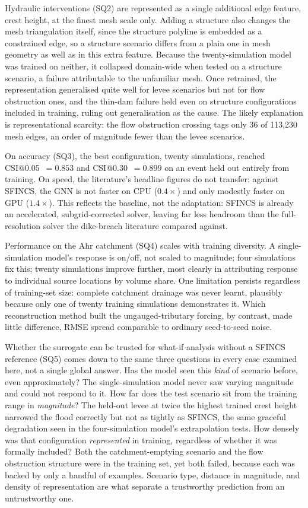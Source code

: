\documentclass[12pt,a4paper]{report}
\begin{document}
{Hydraulic interventions (SQ2) are represented as a single additional edge feature, crest height, at the finest mesh scale only. Adding a structure also changes the mesh triangulation itself, since the structure polyline is embedded as a constrained edge, so a structure scenario differs from a plain one in mesh geometry as well as in this extra feature. Because the twenty-simulation model was trained on neither, it collapsed domain-wide when tested on a structure scenario, a failure attributable to the unfamiliar mesh. Once retrained, the representation
generalised quite well for levee scenarios but not for flow obstruction ones, and the thin-dam
failure held even on structure configurations included in training, ruling out generalisation as the cause. The likely
explanation is representational scarcity: the flow obstruction crossing tags only 36 of
113{,}230 mesh edges, an order of magnitude fewer than the levee scenarios.
 
On accuracy (SQ3), the best configuration, twenty simulations, reached
CSI@0.05~$=0.853$ and CSI@0.30~$=0.899$ on an event held out entirely from
training. On speed, the literature's headline figures do not transfer: against
SFINCS, the GNN is not faster on CPU ($0.4\times$) and only modestly faster on GPU
($1.4\times$). This reflects the baseline, not the adaptation: SFINCS is already an
accelerated, subgrid-corrected solver, leaving far less headroom than the
full-resolution solver the dike-breach literature compared against.
 
Performance on the Ahr catchment (SQ4) scales with training diversity. A
single-simulation model's response is on/off, not scaled to magnitude; four
simulations fix this; twenty simulations improve further, most clearly in
attributing response to individual source locations by volume share. One
limitation persists regardless of training-set size: complete catchment drainage
was never learnt, plausibly because only one of twenty training simulations
demonstrates it. Which reconstruction method built the ungauged-tributary forcing,
by contrast, made little difference, RMSE spread comparable to ordinary
seed-to-seed noise.
 
Whether the surrogate can be trusted for what-if analysis without a SFINCS
reference (SQ5) comes down to the same three questions in every case examined
here, not a single global answer. Has the model seen this \emph{kind} of scenario
before, even approximately? The single-simulation model never saw varying
magnitude and could not respond to it. How far does the test scenario sit from the
training range in \emph{magnitude}? The held-out levee at twice the highest
trained crest height narrowed the flood correctly but not as tightly as SFINCS,
the same graceful degradation seen in the four-simulation model's extrapolation
tests. How densely was that configuration \emph{represented} in training,
regardless of whether it was formally included? Both the catchment-emptying
scenario and the flow obstruction structure were in the training set, yet both failed,
because each was backed by only a handful of examples. Scenario type, distance in
magnitude, and density of representation are
what separate a trustworthy prediction from an untrustworthy one.
 
}
\end{document}
